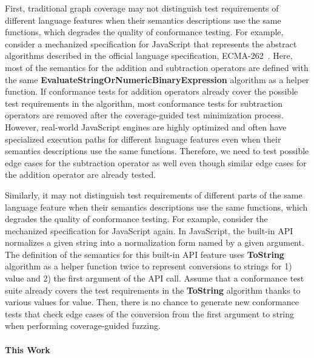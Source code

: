 First, traditional graph coverage may not distinguish test requirements of
different language features when their semantics descriptions
use the same functions, which degrades the quality of conformance testing.
For example, consider a mechanized specification for JavaScript that represents the
abstract algorithms described in the official language specification, ECMA-262~\cite{es13}.
Here, most of the semantics for the addition and subtraction operators are
defined with the same \textbf{EvaluateStringOrNumericBinaryExpression} algorithm as a helper function.
If conformance tests for addition operators already cover the possible test
requirements in the algorithm, most conformance tests for subtraction operators
are removed after the coverage-guided test minimization process.
However, real-world JavaScript engines are highly optimized and often have
specialized execution paths for different language features
even when their semantics descriptions use the same functions.
Therefore, we need to test possible edge cases for the subtraction operator as
well even though similar edge cases for the addition operator are already tested.


Similarly, it may not distinguish test requirements of different
parts of the same language feature when their semantics descriptions
use the same functions, which degrades the quality of conformance testing.
For example, consider the mechanized specification for JavaScript again.
In JavaScript, the  built-in API normalizes
a given string into a normalization form named by a given argument.
The definition of the semantics for this built-in API feature uses
\textbf{ToString} algorithm as a helper function twice to represent
conversions to strings for 1)  value and 2) the first argument of the API call.
Assume that a conformance test suite already covers the test requirements in the
\textbf{ToString} algorithm thanks to various values for  value.
Then, there is no chance to generate new conformance tests that check edge cases
of the conversion from the first argument to string when performing coverage-guided fuzzing.


\paragraph{\textbf{This Work}}

